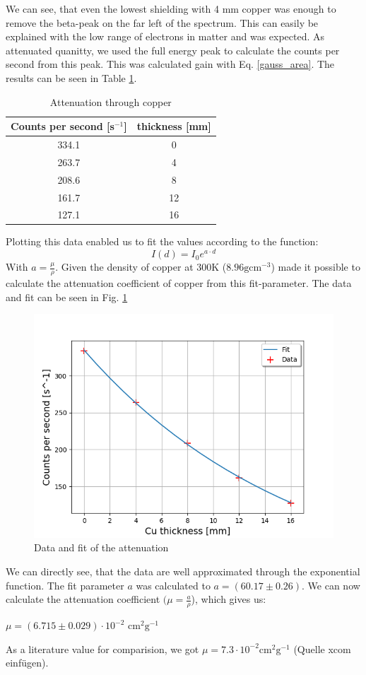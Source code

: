 We can see, that even the lowest shielding with 4 mm copper was enough to remove the beta-peak on the far left of the spectrum.
This can easily be explained with the low range of electrons in matter and was expected.
As attenuated quanitty, we used the full energy peak to calculate the counts per second from this peak.
This was calculated gain with Eq. \ref{gauss_area}.
The results can be seen in Table \ref{attenuation_values}.
\begin{table}[h]
\centering
\begin{tabular}{c |c }
\hline
Counts per second [s$^{-1}$] & thickness [mm] \\
\hline
334.1 & 0 \\
263.7 & 4 \\
208.6 & 8 \\
161.7 & 12 \\
127.1 & 16 \\
\hline
\end{tabular}
\caption{Attenuation through copper}
\label{attenuation_values}
\end{table}
Plotting this data enabled us to fit the values according to the function:
\begin{equation}
I(d) = I_0 e^{a \cdot d}
\end {equation}
With $a = \frac{\mu}{\rho}$.
Given the density of copper at $300$K ($8.96 \text{gcm}^{-3}$) made it possible to calculate the attenuation coefficient of copper from this fit-parameter.
The data and fit can be seen in Fig. \ref{attenuation_fit}
\begin{figure}[h]
  \includegraphics[width=\linewidth]{../Plots/attenuation.png}
  \caption{Data and fit of the attenuation}
  \label{attenuation_fit}
\end{figure}
We can directly see, that the data are well approximated through the exponential function.
The fit parameter $a$ was calculated to $a = (60.17 \pm 0.26)$.
We can now calculate the attenuation coefficient $(\mu = \frac{a}{\rho}$), which gives us:

$\mu = (6.715 \pm 0.029) \cdot 10^{-2}$ $\text{cm}^2 \text{g}^{-1}$

As a literature value for comparision, we got $\mu = 7.3 \cdot 10^{-2}\text{cm}^2 \text{g}^{-1}$ (Quelle xcom einfügen).
\clearpage

